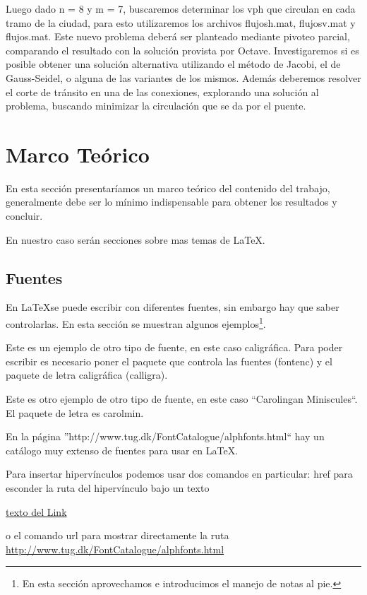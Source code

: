 \documentclass[a4paper,11pt]{article}
\begin{document}
Luego dado n = 8 y m = 7, buscaremos determinar los vph que circulan en cada tramo de la ciudad, para esto utilizaremos los archivos flujosh.mat, flujosv.mat y flujos.mat. Este nuevo problema deberá ser planteado mediante pivoteo parcial, comparando el resultado con la solución provista por Octave. Investigaremos si es posible obtener una solución alternativa utilizando el método de Jacobi, el de Gauss-Seidel, o alguna de las variantes de los mismos. Además deberemos resolver el corte de tránsito en una de las conexiones, explorando una solución al problema, buscando minimizar la circulación que se da por el puente.


\section{Marco Teórico}
%
En esta sección presentaríamos un marco teórico del contenido del trabajo, generalmente debe ser lo mínimo indispensable para obtener los resultados y concluir.

En nuestro caso serán secciones sobre mas temas de \LaTeX.

\subsection{Fuentes}

En \LaTeX se puede escribir con diferentes fuentes, sin embargo hay que saber controlarlas. En esta sección se muestran algunos ejemplos\footnote{En esta sección aprovechamos e introducimos el manejo de notas al pie.}.

Este es un ejemplo de otro tipo de fuente, en este caso caligráfica. Para poder escribir es necesario poner el paquete que controla las fuentes (fontenc) y el paquete de letra caligráfica (calligra).

Este es otro ejemplo de otro tipo de fuente, en este caso ``Carolingan Miniscules``. El paquete de letra es carolmin.

\normalfont
En la página ''http://www.tug.dk/FontCatalogue/alphfonts.html`` hay un catálogo muy extenso de fuentes para usar en \LaTeX. 

Para insertar hipervínculos podemos usar dos comandos en particular: href para esconder la ruta del hipervínculo bajo un texto

\href{http://www.tug.dk/FontCatalogue/alphfonts.html}{texto del Link}

o el comando url para mostrar directamente la ruta
\url{http://www.tug.dk/FontCatalogue/alphfonts.html}
\end{document}
